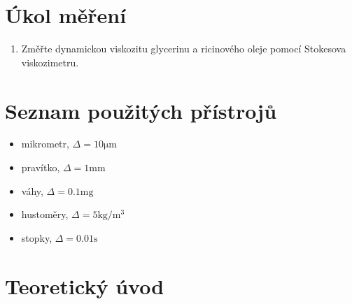 \documentclass[titlepage]{article}
\begin{document}
\begin{titlepage}
	
\end{titlepage}

\tableofcontents
\newpage

\section{Úkol měření}
\begin{enumerate}
	\item Změřte dynamickou viskozitu glycerinu a ricinového oleje pomocí Stokesova viskozimetru.
\end{enumerate}

\section{Seznam použitých přístrojů}
\begin{itemize}
\item mikrometr, $\Delta = 10 \si{\micro\meter}$
\item pravítko, $\Delta = 1 \si{\milli\meter}$
\item váhy, $\Delta = 0.1 \si{\milli\gram}$
\item hustoměry, $\Delta = 5 \si{\kilogram\per\cubic\meter}$
\item stopky, $\Delta = 0.01 \si{\second}$
\end{itemize}

\section{Teoretický úvod}
\end{document}
